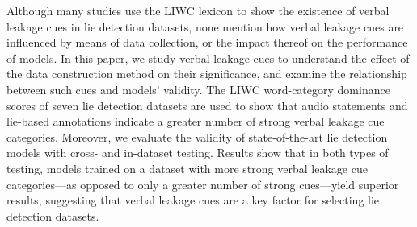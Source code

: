 Although many studies use the LIWC lexicon to show the existence of verbal leakage cues in lie detection datasets, none mention how verbal leakage cues are influenced by means of data collection, or the impact thereof on the performance of models. In this paper, we study verbal leakage cues to understand the effect of the data construction method on their significance, and examine the relationship between such cues and models' validity. The LIWC word-category dominance scores of seven lie detection datasets are used to show that audio statements and lie-based annotations indicate a greater number of strong verbal leakage cue categories. Moreover, we evaluate the validity of state-of-the-art lie detection models with cross- and in-dataset testing. Results show that in both types of testing, models trained on a dataset with more strong verbal leakage cue categories---as opposed to only a greater number of strong cues---yield superior results, suggesting that verbal leakage cues are a key factor for selecting lie detection datasets.

